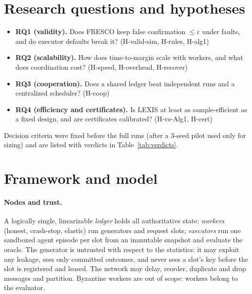 \documentclass[11pt]{article}
\theoremstyle{definition}
\theoremstyle{remark}
\begin{document}
\section{Research questions and hypotheses}\label{sec:rq}
\begin{itemize}
\item \textbf{RQ1 (validity).} Does FRESCO keep false confirmation $\le\varepsilon$ under faults, and do executor defaults break it? (H-valid-sim, H-rules, H-alg1)
\item \textbf{RQ2 (scalability).} How does time-to-margin scale with workers, and what does coordination cost? (H-speed, H-overhead, H-recover)
\item \textbf{RQ3 (cooperation).} Does a shared ledger beat independent runs and a centralized scheduler? (H-coop)
\item \textbf{RQ4 (efficiency and certificates).} Is LEXIS at least as sample-efficient as a fixed design, and are certificates calibrated? (H-vs-Alg1, H-cert)
\end{itemize}
Decision criteria were fixed before the full runs (after a 3-seed pilot used only for sizing) and are listed with verdicts in Table~\ref{tab:verdicts}.

\section{Framework and model}\label{sec:model}

\paragraph{Nodes and trust.} A logically single, linearizable \emph{ledger} holds all authoritative state; \emph{workers} (honest, crash-stop, elastic) run generators and request slots; \emph{executors} run one sandboxed agent episode per slot from an immutable snapshot and evaluate the oracle. The generator is untrusted with respect to the statistics: it may exploit any leakage, sees only committed outcomes, and never sees a slot's key before the slot is registered and leased. The network may delay, reorder, duplicate and drop messages and partition. Byzantine workers are out of scope: workers belong to the evaluator.
\end{document}
